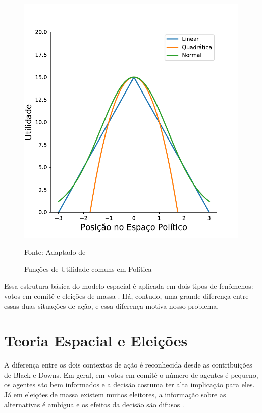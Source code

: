 \begin{figure}[H]
  \centering \includegraphics[scale = 0.6]{ims/utilities.pdf}
  \caption{Funções de Utilidade comuns em Política}
  Fonte: Adaptado de 
\end{figure}

Essa estrutura básica do modelo espacial é aplicada em dois tipos de fenômenos:
votos em comitê e eleições de massa \cite{munger2015choosing}. Há, contudo, uma
grande diferença entre essas duas situações de ação, e essa diferença motiva
nosso problema.


\section{Teoria Espacial e Eleições}


A diferença entre os dois contextos de ação é reconhecida desde as contribuições
de Black e Downs. Em geral, em votos em comitê o número de agentes é
pequeno, os agentes são bem informados e a decisão costuma ter alta implicação
para eles. Já em eleições de massa existem muitos eleitores, a informação sobre
as alternativas é ambígua e os efeitos da decisão são difusos
\cite{munger2015choosing}.

